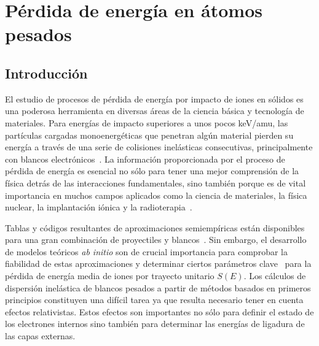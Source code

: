 \chapter{Pérdida de energía en átomos pesados}
\label{chap:heavy}

\section{Introducción}
\label{sec:intro}

El estudio de procesos de pérdida de energía por impacto de iones 
en sólidos es una poderosa herramienta en diversas áreas de la ciencia
básica y tecnología de materiales. Para energías de impacto superiores 
a unos pocos keV/amu, las partículas cargadas monoenergéticas que 
penetran algún material pierden su energía a través de una serie de 
colisiones inelásticas consecutivas, principalmente con blancos
electrónicos~\cite{Chu:01,Sigmund:06}. La información proporcionada por 
el proceso de pérdida de energía es esencial no sólo para tener una 
mejor comprensión de la física detrás de las interacciones 
fundamentales, sino también porque es de vital importancia en muchos 
campos aplicados como la ciencia de materiales, la física nuclear, la 
implantación iónica y la radioterapia~\cite{Sigmund:06,Schardt:10}. 

Tablas y códigos resultantes de aproximaciones semiempíricas están 
disponibles para una gran combinación de proyectiles y 
blancos~\cite{iaea_codes,Paul:03}. Sin embargo, el desarrollo de modelos
teóricos \textit{ab initio} son de crucial importancia para comprobar la 
fiabilidad de estas aproximaciones y determinar ciertos parámetros 
clave~\cite{Diwan:15,Damache:04,Damache:02} para la pérdida de energía 
media de iones por trayecto unitario $S(E)$. Los cálculos de dispersión 
inelástica de blancos pesados a partir de métodos basados en primeros 
principios constituyen una difícil tarea ya que resulta necesario tener 
en cuenta efectos relativistas. Estos efectos son importantes no sólo 
para definir el estado de los electrones internos sino también para 
determinar las energías de ligadura de las capas externas.

